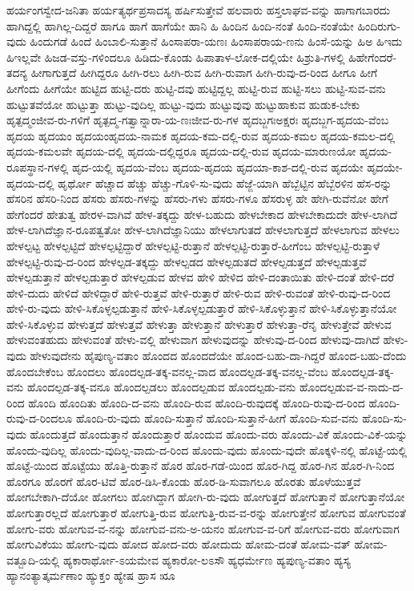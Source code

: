 {ಹರ್ಯಂಗಸ್ವೇದ-ಜನಿತಾ
ಹರ್ಯತ್ಯರ್ಥಪ್ರಸಾದಸ್ಯ
ಹರ್ಷಿಸುತ್ತೇವೆ
ಹಲವಾರು
ಹಸ್ತಲಾಘವ-ವನ್ನು
ಹಾಗಾಗಬಾರದು
ಹಾಗಿದ್ದಲ್ಲಿ
ಹಾಗಿಲ್ಲ-ದಿದ್ದರೆ
ಹಾಗೂ
ಹಾಗೆ
ಹಾಗೆಯೇ
ಹಾನಿ
ಹಿ
ಹಿಂದಿನ
ಹಿಂದಿ-ನಂತೆ
ಹಿಂದಿ-ನಂತೆಯೇ
ಹಿಂದಿರುಗು-ವುದು
ಹಿಂದುಗಡೆ
ಹಿಂದೆ
ಹಿಂಬಾಲಿ-ಸುತ್ತಾನೆ
ಹಿಂಸಾಪರಾ-ಯಣಃ
ಹಿಂಸಾಪರಾಯ-ಣನು
ಹಿಂಸೆ-ಯನ್ನು
ಹಿಅ
ಹಿಇದು
ಹಿಇಲ್ಲವೇ
ಹಿಜಡ-ವಸ್ತು-ಗಳಿಂದಲೂ
ಹಿಡಿದು-ಕೊಂಡು
ಹಿಪಾತಾಳ-ಲೋಕ-ದಲ್ಲಿಯೇ
ಹಿಶ್ರುತಿ-ಗಳಲ್ಲಿ
ಹಿಹೇಗೆಂದರೆ-ತದನ್ಯ
ಹೀಗಾಗುತ್ತದೆ
ಹೀಗಿದ್ದರೂ
ಹೀಗಿ-ರಲು
ಹೀಗಿ-ರುವ
ಹೀಗಿ-ರುವಾಗ
ಹೀಗಿ-ರುವು-ದ-ರಿಂದ
ಹೀಗೂ
ಹೀಗೆ
ಹೀಗೆಂದು
ಹೀಗೆಯೇ
ಹುಟ್ಟಿದ
ಹುಟ್ಟಿ-ದರು
ಹುಟ್ಟಿ-ದವು
ಹುಟ್ಟಿದ್ದಲ್ಲ
ಹುಟ್ಟಿ-ರುವ
ಹುಟ್ಟಿ-ಸಲು
ಹುಟ್ಟಿ-ಸುವ-ವನು
ಹುಟ್ಟುತವೆಯೋ
ಹುಟ್ಟುತ್ತಾ
ಹುಟ್ಟು-ವುದಿಲ್ಲ
ಹುಟ್ಟು-ವುದು
ಹುಟ್ಟುವುವು
ಹುಟ್ಟುಹಾಕುವ
ಹುಡುಕ-ಬೇಕು
ಹೃತ್ಪದ್ಮಂಜೀವ-ರು-ಗಳಿಗೆ
ಹೃತ್ಪದ್ಮ-ಗತ್ವಾನ್ನಾರಾ-ಯ-ಣಃಜೀವ-ರು-ಗಳ
ಹೃದಬ್ಜಗಃಅಕ್ಷರಃ
ಹೃದಬ್ಜಗ-ಹೃದಯ-ವೆಂಬ
ಹೃದಯ
ಹೃದಯಂ
ಹೃದಯಂಹೃದಯ-ನಾಮಕ
ಹೃದಯ-ಕಮ-ದಲ್ಲಿ-ರುವ
ಹೃದಯ-ಕಮಲ
ಹೃದಯ-ಕಮಲ-ದಲ್ಲಿ
ಹೃದಯ-ಕಮಲವೇ
ಹೃದಯ-ದಲ್ಲಿ
ಹೃದಯ-ದಲ್ಲಿದ್ದರೂ
ಹೃದಯ-ದಲ್ಲಿ-ರುವ
ಹೃದಯ-ಮಾರುಣಯೋ
ಹೃದಯ-ರೂಪಸ್ಥಾನ-ಗಳಲ್ಲಿ
ಹೃದ-ಯಲ್ಲಿ
ಹೃದಯ-ವೆಂಬ
ಹೃದಯ-ಹೃದಯ
ಹೃದಯಾ-ಕಾಶ-ದಲ್ಲಿ-ರುವ
ಹೃದಯೇ
ಹೃದಯೇ-ಹೃದಯ-ದಲ್ಲಿ
ಹೃರ್ಥೋ
ಹೆಚ್ಚಾದ
ಹೆಚ್ಚು
ಹೆಚ್ಚು-ಗೊಳಿ-ಸು-ವುದು
ಹೆಜ್ಜೆ-ಯಾಗಿ
ಹೆಬ್ಬೆಟ್ಟಿನ
ಹೆಬ್ಬೆರಳಿನ
ಹೆಸ-ರನ್ನು
ಹೆಸರಿನ
ಹೆಸರಿ-ನಿಂದ
ಹೆಸರು
ಹೆಸರು-ಗಳನ್ನು
ಹೆಸರು-ಗಳು
ಹೆಸರು-ಗಳೂ
ಹೆಸರುಳ್ಳ
ಹೇ
ಹೇಗಿ-ರುವೆನೋ
ಹೇಗೆ
ಹೇಗೆಂದರೆ
ಹೇತುತ್ವ
ಹೇರಳ-ವಾಗಿವೆ
ಹೇಳ-ತಕ್ಕದ್ದು
ಹೇಳ-ಬಹುದು
ಹೇಳಬೇಕಾದ
ಹೇಳಬೇಕಾದುದೇ
ಹೇಳ-ಲಾಗಿದೆ
ಹೇಳ-ಲಾಗಿದೆಜ್ಞಾನ-ರೂಪತ್ವತೋ
ಹೇಳ-ಲಾಗಿದೆಜ್ಞಾನಿಯು
ಹೇಳಲಾಗುತದೆ
ಹೇಳಲಾಗುತ್ತದೆ
ಹೇಳಲಾಗುವ
ಹೇಳಲು
ಹೇಳಲ್ಪಟ್ಟ
ಹೇಳಲ್ಪಟ್ಟಿದೆ
ಹೇಳಲ್ಪಟ್ಟಿದ್ದಾರೆ
ಹೇಳಲ್ಪಟ್ಟಿ-ರುತ್ತಾನೆ
ಹೇಳಲ್ಪಟ್ಟಿ-ರುತ್ತಾರೆ-ಹೀಗೆಂಬ
ಹೇಳಲ್ಪಟ್ಟಿ-ರುತ್ತಾಳೆ
ಹೇಳಲ್ಪಟ್ಟಿ-ರುವು-ದ-ರಿಂದ
ಹೇಳಲ್ಪಡ-ತಕ್ಕದ್ದು
ಹೇಳಲ್ಪಡದ
ಹೇಳಲ್ಪಡುತದೆ
ಹೇಳಲ್ಪಡುತ್ತದೆ
ಹೇಳಲ್ಪಡುತ್ತವೆ
ಹೇಳಲ್ಪಡುತ್ತಾನೆ
ಹೇಳಲ್ಪಡುತ್ತಾರೆ
ಹೇಳಲ್ಪಡುವ
ಹೇಳವ
ಹೇಳಿ
ಹೇಳಿದ
ಹೇಳಿ-ದಂತಾಯಿತು
ಹೇಳಿ-ದಂತೆ
ಹೇಳಿ-ದರೆ
ಹೇಳಿ-ದುದು
ಹೇಳಿದೆ
ಹೇಳಿದ್ದಾರೆ
ಹೇಳಿ-ರುತ್ತವೆ
ಹೇಳಿ-ರುತ್ತಾರೆ
ಹೇಳಿ-ರುವ
ಹೇಳಿ-ರುವಂತೆ
ಹೇಳಿ-ರುವು-ದ-ರಿಂದ
ಹೇಳಿ-ರು-ವುದು
ಹೇಳಿ-ಸಿಕೊಳ್ಳಲ್ಪಡುತ್ತಾನೆ
ಹೇಳಿ-ಸಿಕೊಳ್ಳಲ್ಪಡುತ್ತಾರೆ
ಹೇಳಿ-ಸಿಕೊಳ್ಳುತ್ತಾನೆ
ಹೇಳಿ-ಸಿಕೊಳ್ಳುತ್ತಾನೆಯೋ
ಹೇಳಿ-ಸಿಕೊಳ್ಳುವ
ಹೇಳುತ್ತದೆ
ಹೇಳುತ್ತವೆ
ಹೇಳುತ್ತಾ
ಹೇಳುತ್ತಾನೆ
ಹೇಳುತ್ತಾರೆ
ಹೇಳುತ್ತಾ-ರೆನೃ
ಹೇಳುತ್ತೇವೆ
ಹೇಳುವ
ಹೇಳುವಂತಹುದು
ಹೇಳುವಂತೆ
ಹೇಳು-ವಲ್ಲಿ
ಹೇಳುವಾಗ
ಹೇಳುವುದನ್ನು
ಹೇಳುವು-ದ-ರಿಂದ
ಹೇಳುವು-ದಾಗಿದೆ
ಹೇಳು-ವುದು
ಹೇಳುವುದೇನು
ಹೈಪುಣ್ಯ-ವತಾಂ
ಹೊಂದದ
ಹೊಂದದೆಯೇ
ಹೊಂದ-ಬಹು-ದಾ-ಗಿದ್ದರೆ
ಹೊಂದ-ಬಹು-ದೆಂದು
ಹೊಂದಬೇಕೆಂಬ
ಹೊಂದಲು
ಹೊಂದಲ್ಪಡ-ತಕ್ಕ-ವನಲ್ಲ-ವಾದ
ಹೊಂದಲ್ಪಡ-ತಕ್ಕ-ವನಲ್ಲ-ವೆಂಬ
ಹೊಂದಲ್ಪಡ-ತಕ್ಕ-ವನು
ಹೊಂದಲ್ಪಡ-ತಕ್ಕ-ವನೂ
ಹೊಂದಲ್ಪಡಲು
ಹೊಂದಲ್ಪಡುವ
ಹೊಂದಲ್ಪಡು-ವನು
ಹೊಂದಲ್ಪಡುವ-ವ-ನಾದು-ದ-ರಿಂದ
ಹೊಂದಿ
ಹೊಂದಿತು
ಹೊಂದಿ-ದ-ವನು
ಹೊಂದಿ-ರುವ
ಹೊಂದಿ-ರುವುದಕ್ಕೆ
ಹೊಂದಿ-ರುವು-ದ-ರಿಂದ
ಹೊಂದಿ-ರುವು-ದ-ರಿಂದಲೂ
ಹೊಂದಿ-ರು-ವುದು
ಹೊಂದಿ-ಸುತ್ತಾನೆ
ಹೊಂದಿ-ಸುತ್ತಾನೆ-ಹೀಗೆ
ಹೊಂದಿ-ಸುವ-ವನು
ಹೊಂದಿ-ಸು-ವುದು
ಹೊಂದುತ್ತದೆ
ಹೊಂದುತ್ತಾನೆ
ಹೊಂದುತ್ತಾರೆ
ಹೊಂದುವ
ಹೊಂದು-ವರು
ಹೊಂದು-ವಿಕೆ
ಹೊಂದು-ವಿಕೆ-ಯನ್ನು
ಹೊಂದು-ವುದಿಲ್ಲ
ಹೊಂದು-ವುದಿಲ್ಲ-ವಾದು-ದ-ರಿಂದ
ಹೊಂದು-ವುದು
ಹೊಂದು-ವುದೇ
ಹೊಕ್ಕಳಿ-ನಲ್ಲಿ
ಹೊಟ್ಟೆ-ಯಲ್ಲಿ
ಹೊಟ್ಟೆ-ಯಿಂದ
ಹೊಟ್ಟೆಯು
ಹೊತ್ತಿ-ರುತ್ತಾನೆ
ಹೊರ
ಹೊರ-ಗಡೆ-ಯಿಂದ
ಹೊರ-ಗಿದ್ದ
ಹೊರ-ಗಿನ
ಹೊರ-ಗಿ-ನಿಂದ
ಹೊರಗೂ
ಹೊರಗೆ
ಹೊರ-ಟಿವೆ
ಹೊರ-ಡಿಸಿ-ಕೊಂಡು
ಹೊರ-ಡಿ-ಸುವಾಗಲೂ
ಹೊರತು
ಹೊಳೆಯುತ್ತವೆ
ಹೋಗಬೇಕಾಗಿ-ದೆಯೋ
ಹೋಗಲು
ಹೋಗಿದ್ದಾಗ
ಹೋಗಿ-ರು-ವುದು
ಹೋಗುತ್ತದೆ
ಹೋಗುತ್ತಾನೆ
ಹೋಗುತ್ತಾನೆಯೋ
ಹೋಗುತ್ತಾರಲ್ಲದೆ
ಹೋಗುತ್ತಾರೆ
ಹೋಗುತ್ತಿ-ರುವ
ಹೋಗುತ್ತಿ-ರುವ-ವ-ರನ್ನು
ಹೋಗುತ್ತೇನೆ
ಹೋಗುವ
ಹೋಗುವಂತೆ
ಹೋಗು-ವರು
ಹೋಗುವ-ವ-ನನ್ನು
ಹೋಗುವ-ವನು-ಅ-ಯನಂ
ಹೋಗುವ-ವ-ರಿಗೆ
ಹೋಗುವ-ವರು
ಹೋಗುವಾಗ
ಹೋಗುವಿಕೆಯು
ಹೋಗು-ವುದು
ಹೋದ
ಹೋದ-ವರು
ಹೋದುದು
ಹೋಮ-ದಂತೆ
ಹೋಮ-ವತ್
ಹೋಮ-ವತ್ಬೂದಿ-ಯಲ್ಲಿ
ಹ್ಯಕಾರಾರ್ಥೋ-ಽಯಮೇವ
ಹ್ಯಕಾರೋ-ಲಽಸೌ
ಹ್ಯಧರ್ಮೇಣ
ಹ್ಯಪುಣ್ಯ-ವತಾಂ
ಹ್ಯಸ್ಯ
ಹ್ಯಾನಂತ್ಯಾತ್ಕರ್ಮಣಾಂ
ಹ್ಯುಕ್ತಂ
ಹ್ಯೇಷ
ಹ್ರಾಸ
ೠ
}
